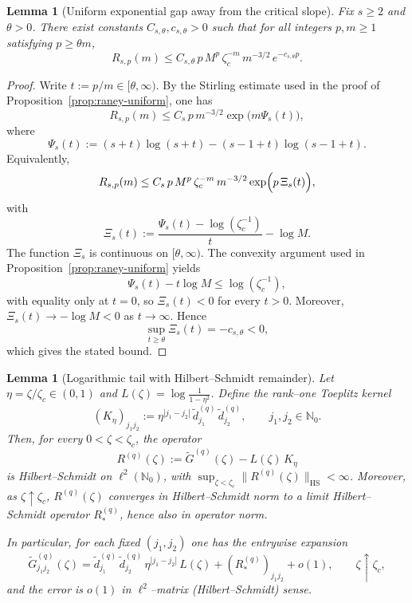 \documentclass[11pt]{amsart}
\numberwithin{equation}{section}
\theoremstyle{plain}
\newtheorem{lemma}[theorem]{Lemma}
\theoremstyle{definition}
\theoremstyle{remark}
\newcommand{\NN}{\mathbb{N}}
\begin{document}
\begin{lemma}[Uniform exponential gap away from the critical slope]\label{lem:raney-gap}
	Fix $s\ge2$ and $\theta>0$.  There exist constants $C_{s,\theta},c_{s,\theta}>0$
	such that for all integers $p,m\ge1$ satisfying $p\ge\theta m$,
	\[
		R_{s,p}(m)
		\le
		C_{s,\theta}\,p\,M^{p}\,\zeta_c^{-m}\,m^{-3/2}\,e^{-c_{s,\theta}p}.
	\]
\end{lemma}

\begin{proof}
	Write $t:=p/m\in[\theta,\infty)$.  By the Stirling estimate used in the proof
	of Proposition~\ref{prop:raney-uniform}, one has
	\[
		R_{s,p}(m)
		\le
		C_s\,p\,m^{-3/2}\exp\bigl(m\Psi_s(t)\bigr),
	\]
	where
	\[
		\Psi_s(t):=(s+t)\log(s+t)-(s-1+t)\log(s-1+t).
	\]
	Equivalently,
	\[
		R_{s,p}(m)
		\le
		C_s\,p\,M^p\,\zeta_c^{-m}\,m^{-3/2}
		\exp\Bigl(p\,\Xi_s(t)\Bigr),
	\]
	with
	\[
		\Xi_s(t):=\frac{\Psi_s(t)-\log(\zeta_c^{-1})}{t}-\log M.
	\]
	The function $\Xi_s$ is continuous on $[\theta,\infty)$.  The convexity
	argument used in Proposition~\ref{prop:raney-uniform} yields
	\[
		\Psi_s(t)-t\log M\le \log(\zeta_c^{-1}),
	\]
	with equality only at $t=0$, so $\Xi_s(t)<0$ for every $t>0$.
	Moreover, $\Xi_s(t)\to-\log M<0$ as $t\to\infty$.  Hence
	\[
		\sup_{t\ge\theta}\Xi_s(t)=-c_{s,\theta}<0,
	\]
	which gives the stated bound.
\end{proof}

\begin{lemma}[Logarithmic tail with Hilbert--Schmidt remainder]\label{lem:entrywise-log}
	Let $\eta=\zeta/\zeta_c\in(0,1)$ and $L(\zeta)=\log\frac{1}{1 - \eta^2}$.
	Define the rank--one Toeplitz kernel
	\[
		(K_\eta)_{j_1j_2}:=\eta^{|j_1-j_2|}\,\widetilde d^{(q)}_{j_1}\,\widetilde d^{(q)}_{j_2},
		\qquad j_1,j_2\in\NN_0.
	\]
	Then, for every $0<\zeta<\zeta_c$, the operator
	\[
	R^{(q)}(\zeta):=\widetilde G^{(q)}(\zeta)-L(\zeta)\,K_\eta
	\]
	is Hilbert--Schmidt on $\ell^2(\NN_0)$, with $\sup_{\zeta<\zeta_c}\|R^{(q)}(\zeta)\|_{\mathrm{HS}}<\infty$.
 Moreover, as $\zeta\uparrow\zeta_c$, $R^{(q)}(\zeta)$ converges in Hilbert--Schmidt norm
 to a limit Hilbert--Schmidt operator $R_*^{(q)}$, hence also in operator norm.

	In particular, for each fixed $(j_1,j_2)$ one has the entrywise expansion
	\begin{equation}\label{eq:app-entrywise-log}
		\widetilde G^{(q)}_{j_1j_2}(\zeta)
		=
		\widetilde d^{(q)}_{j_1}\,\widetilde d^{(q)}_{j_2}\,\eta^{|j_1-j_2|}\,L(\zeta)
		+(R_*^{(q)})_{j_1j_2}
		+o(1),
		\qquad \zeta\uparrow\zeta_c,
	\end{equation}
	and the error is $o(1)$ in $\ell^2$--matrix (Hilbert--Schmidt) sense.
\end{lemma}
\end{document}
